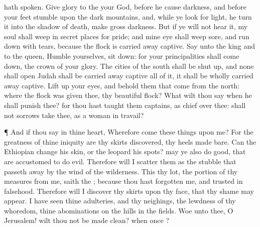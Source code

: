 {{} hath
spoken.
Give
glory to the
{} your
God, before he cause
darkness, and before your
feet
stumble upon the
dark
mountains, and, while ye
look for
light, he
turn it into the shadow of
death,
{}
make
{} gross
darkness.
But if ye will not
hear it, my
soul shall
weep in secret
places
for
{}
pride; and mine
eye shall
weep
sore, and run
down with
tears, because the
{}
flock is carried away
captive.
Say unto the
king and to the
queen,
Humble yourselves, sit
down: for your
principalities shall come
down,
{} the
crown of your
glory.
The
cities of the
south shall be shut
up, and none shall
open
{}
Judah shall be carried away
captive all of it, it shall be
wholly carried away
captive.
Lift
up your
eyes, and
behold them that
come from the
north: where
{} the
flock
{} was
given thee, thy
beautiful
flock?
What wilt thou
say when he shall
punish thee? for thou hast
taught them
{}
captains,
{} as
chief over thee: shall not
sorrows
take thee, as a
woman in
travail?
\par }{\PP {}¶ And if thou
say in thine
heart, Wherefore
come these things upon me? For the
greatness of thine
iniquity are thy
skirts
discovered,
{} thy
heels made
bare.
Can the
Ethiopian
change his
skin, or the
leopard his
spots?
{}
may ye also do
good, that are
accustomed to do
evil.
Therefore will I
scatter them as the
stubble that passeth
away by the
wind of the
wilderness.
This
{} thy
lot, the
portion of thy
measures from me,
saith the
{}; because thou hast
forgotten me, and
trusted in
falsehood.
Therefore will I
discover thy
skirts upon thy
face, that thy
shame may
appear.
I have
seen thine
adulteries, and thy
neighings, the
lewdness of thy
whoredom,
{} thine
abominations on the
hills in the
fields.
Woe unto thee, O
Jerusalem! wilt thou not be made
clean? when
{}
once
{}?

}
